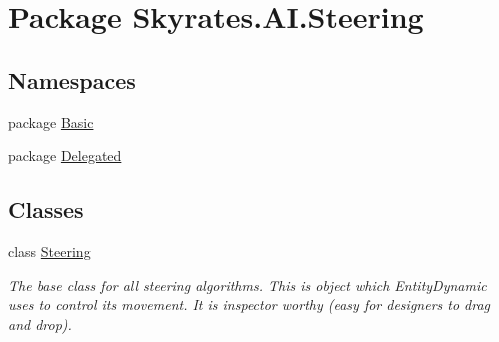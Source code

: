 \hypertarget{namespace_skyrates_1_1_a_i_1_1_steering}{\section{Package Skyrates.\-A\-I.\-Steering}
\label{namespace_skyrates_1_1_a_i_1_1_steering}
}
\subsection*{Namespaces}
\begin{DoxyCompactItemize}
\item 
package \hyperlink{namespace_skyrates_1_1_a_i_1_1_steering_1_1_basic}{Basic}
\item 
package \hyperlink{namespace_skyrates_1_1_a_i_1_1_steering_1_1_delegated}{Delegated}
\end{DoxyCompactItemize}
\subsection*{Classes}
\begin{DoxyCompactItemize}
\item 
class \hyperlink{class_skyrates_1_1_a_i_1_1_steering_1_1_steering}{Steering}
\begin{DoxyCompactList}\small\item\em The base class for all steering algorithms. This is object which Entity\-Dynamic uses to control its movement. It is inspector worthy (easy for designers to drag and drop). \end{DoxyCompactList}\end{DoxyCompactItemize}
